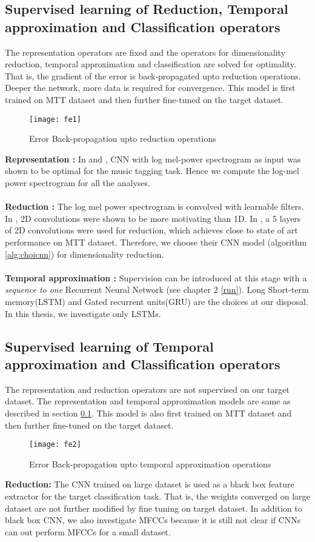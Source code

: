 \subsection{Supervised learning of Reduction, Temporal approximation and Classification operators}
\label{fe1}
The representation operators are fixed and the operators for dimensionality reduction, temporal approximation and classification are solved for optimality. That is, the gradient of the error is back-propagated upto reduction operations. Deeper the network, more data is required for convergence. This model is first trained on MTT dataset and then further fine-tuned on the target dataset.
\begin{figure}[h] 
\centering
\texttt{[image: fe1]}
\caption{Error Back-propagation upto reduction operations }
 \label{fig:fe1}
 \end{figure}
\FloatBarrier

\noindent \textbf{Representation :} In \cite{choi_cnn} and \cite{EndToEnd}, CNN with log mel-power spectrogram as input was shown to be optimal for the music tagging task. Hence we compute the log-mel power spectrogram for all the analyses.\\
\\  
\textbf{Reduction :} The log mel power spectrogram is convolved with learnable filters. In \cite{MusicMotive}, 2D convolutions were shown to be more motivating than 1D. In \cite{choi_cnn}, a 5 layers of 2D convolutions were used for reduction, which achieves close to state of art performance on MTT dataset. Therefore, we choose their CNN model (algorithm \ref{alg:choicnn}) for dimensionality reduction.\\
\\  
\textbf{Temporal approximation :} Supervision can be introduced at this stage with a \textit{sequence to one} Recurrent Neural Network (see chapter 2 \ref{rnn}). Long Short-term memory(LSTM) and Gated recurrent units(GRU) are the choices at our disposal. In this thesis, we investigate only LSTMs. 
        
\subsection{Supervised learning of Temporal approximation and Classification operators}
\label{fe2}
The representation and reduction operators are not supervised on our target dataset. The representation and temporal approximation models are same as described in section \ref{fe1}. This model is also first trained on MTT dataset and then further fine-tuned on the target dataset. 
\begin{figure}[h] 
\centering
\texttt{[image: fe2]}
\caption{Error Back-propagation upto temporal approximation operations }
 \label{fig:fe2}
 \end{figure}
\FloatBarrier
\noindent \textbf{Reduction:} The CNN trained on large dataset is used as a black box feature extractor for the target classification task. That is, the weights converged on large dataset are not further modified by fine tuning on target dataset. In addition to black box CNN, we also investigate MFCCs because it is still not clear if CNNs can out perform MFCCs for a small dataset.


